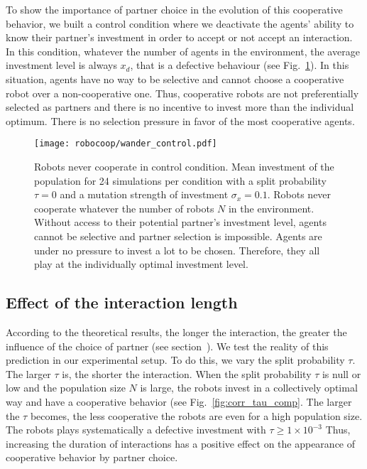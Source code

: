 To show the importance of partner choice in the evolution of this cooperative behavior, %
we built a control condition where we deactivate the agents' ability to know their partner's investment in order to accept or not accept an interaction. %
In this condition, whatever the number of agents in the environment, the average investment level is always $x_d$, that is a defective behaviour (see Fig.~\ref{fig:control}). %
In this situation, agents have no way to be selective and cannot choose a cooperative robot over a non-cooperative one. Thus, cooperative robots are not preferentially selected as partners and there is no incentive to invest more than the individual optimum. There is no selection pressure in favor of the most cooperative agents. %

\begin{figure}[tbhp]
    \begin{center}
        \texttt{[image: robocoop/wander\_control.pdf]}
        \vskip 0.25cm
        \caption{Robots never cooperate in control condition. Mean investment of the population for 24 simulations per condition with a split probability $\tau = 0$ and a mutation strength of investment $\sigma_x = 0.1$. Robots never cooperate whatever the number of robots $N$ in the environment. Without access to their potential partner's investment level, agents cannot be selective and partner selection is impossible. Agents are under no pressure to invest a lot to be chosen. Therefore, they all play at the individually optimal investment level.
        }
        \label{fig:control}
    \end{center}
\end{figure}


\subsection{Effect of the interaction length}


According to the theoretical results, the longer the interaction, the greater the influence of the choice of partner (see section~). We test the reality of this prediction in our experimental setup. %
To do this, we vary the split probability $\tau$.  %
The larger $\tau$ is, the shorter the interaction. When the split probability $\tau$ is null or low and the population size $N$ is large, the robots invest in a collectively optimal way and have a cooperative behavior (see Fig.~\ref{fig:corr_tau_comp}. %
The larger the $\tau$ becomes, the less cooperative the robots are even for a high population size. The robots plays systematically a defective investment with $\tau \geq 1\times 10^{-3}$ Thus, increasing the duration of interactions has a positive effect on the appearance of cooperative behavior by partner choice. %


